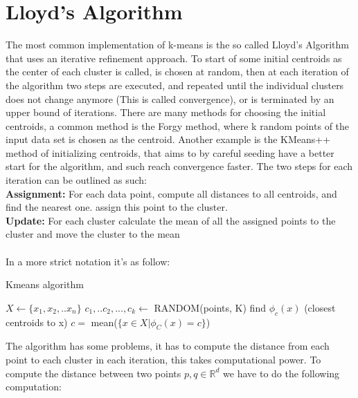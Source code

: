 \documentclass[12pt]{report}
\begin{document}
\section{Lloyd's Algorithm}
\label{subsec:lloyds}

The most common implementation of k-means is the so called Lloyd's Algorithm that uses an iterative refinement approach. To start of some initial centroids as the center of each cluster is called, is chosen at random, then at each iteration of the algorithm two steps are executed, and repeated until the individual clusters does not change anymore (This is called convergence), or is terminated by an upper bound of iterations. There are many methods for choosing the initial centroids, a common method is the Forgy method, where k random points of the input data set is chosen as the centroid. Another example is the KMeans++ method of initializing centroids, that aims to by careful seeding have a better start for the algorithm, and such reach convergence faster.\cite{plusplus} The two steps for each iteration can be outlined as such: \\

\textbf{Assignment:} For each data point, compute all distances to all centroids, and find the nearest one. assign this point to the cluster.\\
\textbf{Update:} For each cluster calculate the mean of all the assigned points to the cluster and move the cluster to the mean\\ \\

In a more strict notation it's as follow:

\begin{algorithm}[h!]
  \caption{Kmeans algorithm}
  \begin{algorithmic}

    \State $\textit{X} \gets \{x_1, x_2, .. x_n\}$
    \State $c_1, ..c_2,...,c_k \gets$ RANDOM(points, K)
    find $\phi_c(x)$ (closest centroids to x)
    \EndFor
    $c =$ mean($\{x \in X | \phi_C(x) = c\}$)
    \EndFor
    \EndWhile
    \EndProcedure
  \end{algorithmic}

\end{algorithm}

The algorithm has some problems, it has to compute the distance from each point to each cluster in each iteration, this takes computational power. To compute the distance between two points $p,q \in \mathbb{R}^d$ we have to do the following computation:
\end{document}
